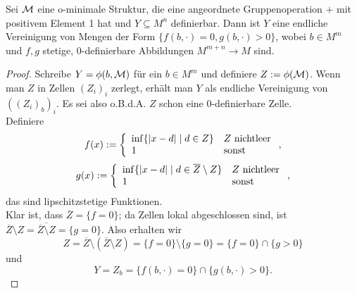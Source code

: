 \begin{lemma}
	Sei $\mathcal{M}$ eine o-minimale Struktur, die eine angeordnete Gruppenoperation $+$ mit positivem Element 1 hat und $Y\subseteq M^n$ definierbar. Dann ist $Y$ eine endliche Vereinigung von Mengen der Form $\{f(b,\cdot)=0,g(b,\cdot)>0\}$, wobei $b\in M^m$ und $f,g$ stetige, 0-definierbare Abbildungen $M^{m+n}\rightarrow M$ sind.
\end{lemma}
\begin{proof}
	Schreibe $Y=\phi(b,\mathcal{M})$ für ein $b\in M^m$ und definiere $Z:=\phi(\mathcal{M})$. Wenn man $Z$ in Zellen $(Z_i)_i$ zerlegt, erhält man $Y$ als endliche Vereinigung von $((Z_i)_b)_i$.  Es sei also o.B.d.A. $Z$ schon eine 0-definierbare Zelle.\\
	Definiere $$f(x):=\left\{\begin{array}{ll}
	\inf\{{\left| x-d \right|}\mid d\in Z\}&Z\text{ nichtleer}\\
	1&\text{sonst}
	\end{array}\right.,$$
	$$g(x):=\left\{\begin{array}{ll}
	\inf\{{\left| x-d \right|}\mid d\in \overline{Z}\setminus Z\}&Z\text{ nichtleer}\\
	1&\text{sonst}
	\end{array}\right.,$$ das sind lipschitzstetige Funktionen.\\
	Klar ist, dass $\overline{Z}=\{f=0\}$; da Zellen lokal abgeschlossen sind, ist $\overline{Z}\setminus Z=\overline{\overline{Z}\setminus Z}=\{g=0\}$. Also erhalten wir $$Z=\overline{Z}\setminus(\overline{Z}\setminus Z)=\{f=0\}\setminus\{g=0\}=\{f=0\}\cap\{g>0\}$$ und $$Y=Z_b=\{f(b,\cdot)=0\}\cap\{g(b,\cdot)>0\}.$$
\end{proof}

